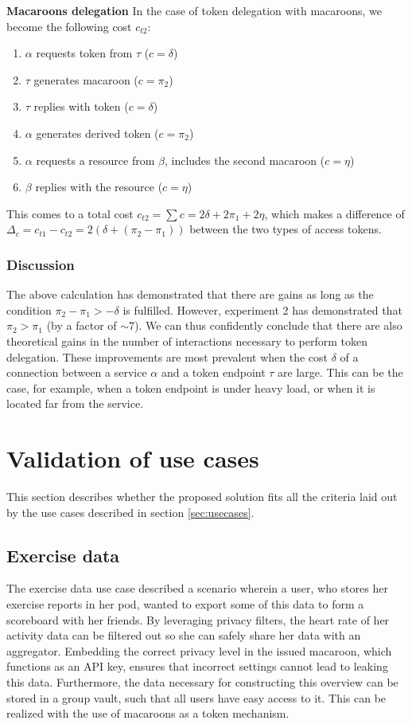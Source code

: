 \noindent\textbf{Macaroons delegation} In the case of token delegation with macaroons, we become the following cost $c_{t2}$:
\begin{multicols}{2}
\begin{enumerate}
    \item $\alpha$ requests token from $\tau$ ($c = \delta$)
    \item $\tau$ generates macaroon ($c = \pi_2$)
    \item $\tau$ replies with token ($c = \delta$)
    \item $\alpha$ generates derived token ($c = \pi_2$)
    \item $\alpha$ requests a resource from $\beta$, includes the second macaroon ($c = \eta$)
    \item $\beta$ replies with the resource ($c = \eta$)
\end{enumerate}
\end{multicols}
\noindent This comes to a total cost $c_{t2} = \sum c = 2\delta + 2\pi_1 + 2\eta$, which makes a difference of $\Delta_c = c_{t1} - c_{t2} = 2(\delta + (\pi_2 - \pi_1))$ between the two types of access tokens.

\subsubsection{Discussion}
The above calculation has demonstrated that there are gains as long as the condition $\pi_2 - \pi_1 > -\delta$ is fulfilled. However, experiment 2 has demonstrated that $\pi_2 > \pi_1$ (by a factor of $\sim 7$). We can thus confidently conclude that there are also theoretical gains in the number of interactions necessary to perform token delegation. These improvements are most prevalent when the cost $\delta$ of a connection between a service $\alpha$ and a token endpoint $\tau$ are large. This can be the case, for example, when a token endpoint is under heavy load, or when it is located far from the service.


\section{Validation of use cases}
This section describes whether the proposed solution fits all the criteria laid out by the use cases described in section \ref{sec:usecases}.

\subsection{Exercise data}
The exercise data use case described a scenario wherein a user, who stores her exercise reports in her pod, wanted to export some of this data to form a scoreboard with her friends. By leveraging privacy filters, the heart rate of her activity data can be filtered out so she can safely share her data with an aggregator. Embedding the correct privacy level in the issued macaroon, which functions as an API key, ensures that incorrect settings cannot lead to leaking this data. Furthermore, the data necessary for constructing this overview can be stored in a group vault, such that all users have easy access to it. This can be realized with the use of macaroons as a token mechanism. 

